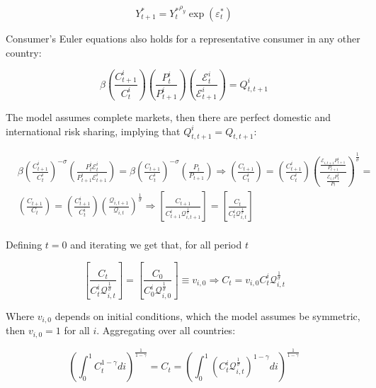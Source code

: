 \documentclass{article}
\newcommand{\E}{\mathcal{E}}
\begin{document}
\begin{equation}
    \label{y_row}
    Y^*_{t+1} = {Y^*_t}^{\rho_y}\exp( \varepsilon^*_t)
\end{equation}

Consumer's Euler equations also holds for a representative consumer in any other country:

$$\beta \left( \frac{C^i_{t+1}}{C_t^i} \right) \left( \frac{P_t^i}{P^i_{t+1}} \right) \left( \frac{\E^i_t}{\E^i_{t+1}} \right) = Q^i_{t, t+1}$$

The model assumes complete markets, then there are perfect domestic and international risk sharing, implying that $Q^i_{t, t+1} = Q_{t,t+1}$:

\begin{equation}
\begin{array}{cc}
     &\beta \left( \frac{C^i_{t+1}}{C_t^i} \right)^{-\sigma} \left( \frac{P_t^i \E^i_t}{P^i_{t+1} \E^i_{t+1}} \right) = \beta \left( \frac{C_{t+1}}{C_t^i} \right)^{-\sigma} \left( \frac{P_t}{P_{t+1}} \right) \Rightarrow \left( \frac{C_{t+1}}{C_t^i} \right) = \left( \frac{C^i_{t+1}}{C_t^i} \right) \left(\frac{\frac{\E_{i,t+1} P^i_{t+1}}{P_{t+1}}}{\frac{\E_{i,t} P^i_{t}}{P_{t}}} \right)^{\frac{1}{\sigma}} = \\
     &\left( \frac{C_{t+1}}{C_t} \right) = \left( \frac{C^i_{t+1}}{C_t^i} \right) \left(\frac{\mathcal{Q}_{i,t+1}}{\mathcal{Q}_{i,t}} \right)^{\frac{1}{\sigma}} \Rightarrow \left[\frac{C_{t+1}}{C^i_{t+1} \mathcal Q_{i,t+1}^{\frac{1}{\sigma}}}\right] =  \left[\frac{C_t}{C^i_t \mathcal Q_{i,t}^{\frac{1}{\sigma}}} \right] \\
\end{array}
\end{equation}

Defining $t = 0$ and iterating we get that, for all period $t$

\begin{equation}
    \left[\frac{C_{t}}{C^i_{t} \mathcal Q_{i,t}^{\frac{1}{\sigma}}}\right] =  \left[\frac{C_0}{C^i_0 \mathcal Q_{i,0}^{\frac{1}{\sigma}}} \right] \equiv v_{i, 0} \Rightarrow C_t = v_{i,0} C^i_t \mathcal Q_{i,t}^{\frac{1}{\sigma}}
\end{equation}

Where $v_{i,0}$ depends on initial conditions, which the model assumes be symmetric, then $v_{i,0} = 1$ for all $i$. Aggregating over all countries:

\begin{equation}
    \label{consumption}
    \left(\int^1_0 C_t^{1-\gamma} di \right)^{\frac{1}{1-\gamma}} = C_t = \left(\int^1_0  \left(C_t^i \mathcal Q_{i,t}^{\frac{1}{\sigma}}\right)^{1-\gamma} di \right)^{\frac{1}{1-\gamma}}
\end{equation}
\end{document}
